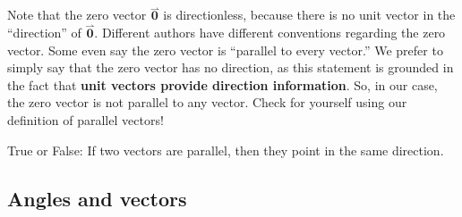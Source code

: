 \documentclass{ximera}
\renewcommand{\vec}[1]{{\overset{\boldsymbol{\rightharpoonup}}{\mathbf{#1}}}}
\begin{document}
Note that the zero vector $\vec 0$ is directionless, because
there is no unit vector in the ``direction'' of $\vec 0$. Different
authors have different conventions regarding the zero vector. Some
even say the zero vector is ``parallel to every vector.'' We prefer to simply say
that the zero vector has no direction, as this statement is grounded in the fact
that \textbf{unit vectors provide direction information}.  So, in our case, 
the zero vector is not parallel to any vector.  Check for yourself 
using our definition of parallel vectors!

\begin{question}
  True or False: If two vectors are parallel, then they point in the same direction.
  \begin{prompt}
    \begin{multipleChoice}
    \end{multipleChoice}
  \end{prompt}
\end{question}




\subsection{Angles and vectors}
\end{document}
